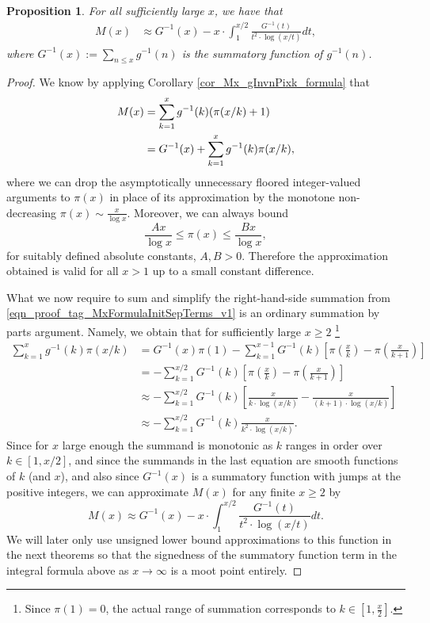 \documentclass[11pt,reqno,a4letter]{article}
\numberwithin{figure}{section}
\numberwithin{table}{section}
\theoremstyle{plain}
\newtheorem{prop}[theorem]{Proposition}
\numberwithin{theorem}{section}
\theoremstyle{definition}
\begin{document}
\begin{prop}
\label{prop_Mx_SBP_IntegralFormula} 
For all sufficiently large $x$, we have that 
\begin{align} 
\label{eqn_pf_tag_v2-restated_v2} 
M(x) & \approx G^{-1}(x) - x \cdot \int_1^{x/2} \frac{G^{-1}(t)}{t^2 \cdot \log(x/t)} dt, 
\end{align} 
where $G^{-1}(x) := \sum_{n \leq x} g^{-1}(n)$ is the summatory function of $g^{-1}(n)$. 
\end{prop} 
\begin{proof} 
We know by applying Corollary \ref{cor_Mx_gInvnPixk_formula} that 
\begin{align} 
\notag
M(x) & = \sum_{k=1}^{x} g^{-1}(k) (\pi(x/k)+1) \\ 
\label{eqn_proof_tag_MxFormulaInitSepTerms_v1} 
     & = G^{-1}(x) + \sum_{k=1}^{x} g^{-1}(k) \pi(x/k), 
\end{align} 
where we can drop the asymptotically unnecessary floored integer-valued arguments to $\pi(x)$ in place of 
its approximation by the monotone non-decreasing $\pi(x) \sim \frac{x}{\log x}$. 
Moreover, we can always 
bound $$\frac{Ax}{\log x} \leq \pi(x) \leq \frac{Bx}{\log x},$$ for suitably defined 
absolute constants, $A,B > 0$. 
Therefore the approximation obtained is valid for all $x > 1$ up to a small constant difference. 

What we now require to sum and simplify the right-hand-side summation from 
\eqref{eqn_proof_tag_MxFormulaInitSepTerms_v1} is an ordinary summation by parts argument. 
Namely, we obtain that for sufficiently large 
$x \geq 2$ \footnote{
     Since $\pi(1) = 0$, the actual range of summation corresponds to 
     $k \in \left[1, \frac{x}{2}\right]$. 
}
\begin{align*} 
\sum_{k=1}^{x} g^{-1}(k) \pi(x/k) & = G^{-1}(x) \pi(1) - \sum_{k=1}^{x-1} G^{-1}(k) \left[ 
     \pi\left(\frac{x}{k}\right) - \pi\left(\frac{x}{k+1}\right)\right] \\ 
     & = -\sum_{k=1}^{x/2} G^{-1}(k) \left[ 
     \pi\left(\frac{x}{k}\right) - \pi\left(\frac{x}{k+1}\right)\right] \\ 
     & \approx -\sum_{k=1}^{x/2} G^{-1}(k) \left[ 
     \frac{x}{k \cdot \log(x/k)} - \frac{x}{(k+1) \cdot \log(x/k)}\right] \\ 
     & \approx -\sum_{k=1}^{x/2} G^{-1}(k) \frac{x}{k^2 \cdot \log(x/k)}. 
\end{align*} 
Since for $x$ large enough the summand is monotonic as $k$ ranges in order over $k \in [1, x/2]$, and 
since the summands in the last equation are smooth functions of $k$ (and $x$), and also since $G^{-1}(x)$ is 
a summatory function with jumps at the positive integers, we can approximate 
$M(x)$ for any finite $x \geq 2$ by 
\[
M(x) \approx G^{-1}(x) - x \cdot \int_1^{x/2} \frac{G^{-1}(t)}{t^2 \cdot \log(x/t)} dt. 
\]
We will later only use unsigned lower bound approximations to this function in the next theorems so that 
the signedness of the summatory function term in the integral formula above 
as $x \rightarrow \infty$ is a moot point entirely. 
\end{proof} 
\end{document}
